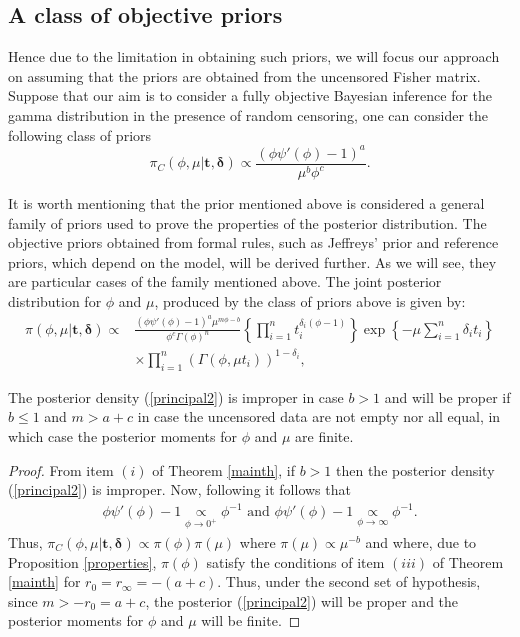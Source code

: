 \subsection{A class of objective priors}

Hence due to the limitation in obtaining such priors, we will focus our approach on assuming that the priors are obtained from the uncensored Fisher matrix. Suppose that our aim is to consider a fully objective Bayesian inference for the gamma distribution in the presence of random censoring, one can consider the following class of priors
\begin{equation}\label{postunnk1} 
\pi_C(\phi,\mu|\boldsymbol{t,\delta})\propto\frac{(\phi\psi'(\phi)-1)^{a}}{\mu^{b}\phi^{c}}.
\end{equation}

It is worth mentioning that the prior mentioned above is considered a general family of priors used to prove the properties of the posterior distribution. The objective priors obtained from formal rules, such as Jeffreys' prior and reference priors, which depend on the model, will be derived further. As we will see, they are particular cases of the family mentioned above.
The joint posterior distribution for $\phi$ and $\mu$, produced by the class of priors above is given by:
\begin{align}\label{principal2}
\pi(\phi,\mu|\boldsymbol{t,\delta})\propto& \frac{(\phi\psi'(\phi)-1)^{a}\mu^{m\phi-b}}{\phi^{c}\Gamma(\phi)^n}\left\{\prod_{i=1}^n{t_i^{\delta_i(\phi-1)}}\right\}\exp\left\{-\mu\sum_{i=1}^n {\delta_i}t_i\right\}\nonumber\\ 
&\times\prod_{i=1}^n\left(\Gamma(\phi,\mu t_i)\right)^{1-\delta_i},
\end{align}

\begin{theorem}\label{principalnow} The posterior density (\ref{principal2}) is improper in case $b>1$ and will be proper if $b\leq 1$ and $m>a+c$ in case the uncensored data are not empty nor all equal, in which case the posterior moments for $\phi$ and $\mu$ are finite.
\end{theorem}
\begin{proof} From item $(i)$ of Theorem \ref{mainth}, if $b>1$ then the posterior density (\ref{principal2}) is improper. Now, following \cite{Pedro2020onposterior} it follows that
\begin{align*}
\phi \psi'(\phi) - 1 \underset{\phi\to 0^+}{\propto} \phi^{-1}\mbox{ and }
\phi\psi'(\phi) - 1 \underset{\phi\to \infty}{\propto} \phi^{-1}.
\end{align*}
Thus, $\pi_C(\phi,\mu|\boldsymbol{t,\delta})\propto \pi(\phi)\pi(\mu)$ where $\pi(\mu)\propto \mu^{-b}$ and where, due to Proposition \ref{properties}, $\pi(\phi)$ satisfy the conditions of item $(iii)$ of Theorem \ref{mainth} for $r_0=r_\infty=-(a+c)$. Thus, under the second set of hypothesis, since $m>-r_0=a+c$, the posterior (\ref{principal2}) will be proper and the posterior moments for $\phi$ and $\mu$ will be finite.
\end{proof}

